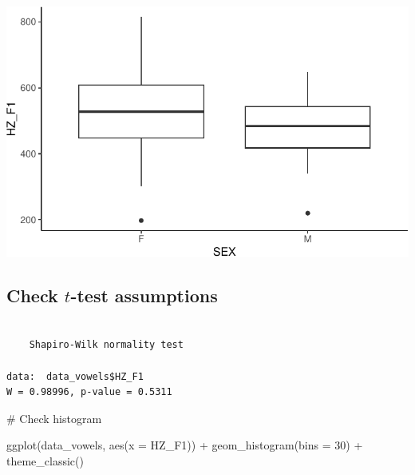\documentclass[
  11pt,
  letterpaper,
  DIV=11,
  numbers=noendperiod]{scrreprt}
\newenvironment{Shaded}{\begin{snugshade}}{\end{snugshade}}
\newcommand{\AttributeTok}[1]{\textcolor[rgb]{0.40,0.45,0.13}{#1}}
\newcommand{\CommentTok}[1]{\textcolor[rgb]{0.37,0.37,0.37}{#1}}
\newcommand{\DecValTok}[1]{\textcolor[rgb]{0.68,0.00,0.00}{#1}}
\newcommand{\FunctionTok}[1]{\textcolor[rgb]{0.28,0.35,0.67}{#1}}
\newcommand{\NormalTok}[1]{\textcolor[rgb]{0.00,0.23,0.31}{#1}}
\newcommand{\SpecialCharTok}[1]{\textcolor[rgb]{0.37,0.37,0.37}{#1}}
\begin{document}
\includegraphics{t_test_files/figure-pdf/unnamed-chunk-7-2.pdf}

\subsection{\texorpdfstring{Check \(t\)-test
assumptions}{Check t-test assumptions}}\label{check-t-test-assumptions}

\begin{Shaded}
\end{Shaded}

\begin{verbatim}

    Shapiro-Wilk normality test

data:  data_vowels$HZ_F1
W = 0.98996, p-value = 0.5311
\end{verbatim}

\begin{Shaded}
\begin{Highlighting}[]
\CommentTok{\# Check histogram}

\FunctionTok{ggplot}\NormalTok{(data\_vowels, }\FunctionTok{aes}\NormalTok{(}\AttributeTok{x =}\NormalTok{ HZ\_F1)) }\SpecialCharTok{+}
  \FunctionTok{geom\_histogram}\NormalTok{(}\AttributeTok{bins =} \DecValTok{30}\NormalTok{) }\SpecialCharTok{+}
  \FunctionTok{theme\_classic}\NormalTok{()}
\end{Highlighting}
\end{Shaded}
\end{document}
